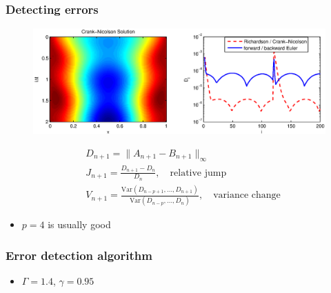 \documentclass{beamer}
\begin{document}
\begin{frame}
\frametitle{Detecting errors}

\begin{figure}
  \centering
  \includegraphics[scale=0.5]{figs/heat_soln_diffs1.eps}
  \vspace{-1cm}
\end{figure}


\begin{align}
& D_{n+1} = \| A_{n+1} - B_{n+1} \|_{\infty} \nonumber \\
& J_{n+1} = \frac{D_{n+1} - D_n}{D_n}, \quad \text{relative jump} \nonumber \\
& V_{n+1} = \frac{\text{Var}(D_{n-p+1}, \ldots, D_{n+1})}{\text{Var}(D_{n-p}, \ldots, D_{n})}, \quad \text{variance change} \nonumber
\end{align}

\begin{itemize}
\item $p = 4$ is usually good
\end{itemize}


\end{frame}

\begin{frame}
  \frametitle{Error detection algorithm}
  

  \begin{algorithm}[H]
  \end{algorithm}
  
  \vspace{0.5cm}
  
  \begin{itemize}
    \item $\Gamma = 1.4$, $\gamma = 0.95$
  \end{itemize}
\end{frame}   
\end{document}
